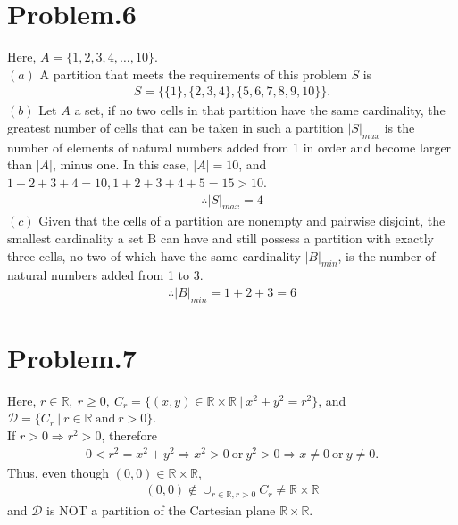 \documentclass[12pt]{article}
\begin{document}
\section*{Problem.6}
Here, $A = \{1,2,3,4,\dots,10\}$.\\[1em]
$(a)$ A partition that meets the requirements of this problem $S$ is
\begin{gather*}
S = \{\{1\}, \{2,3,4\}, \{5,6,7,8,9,10\}\}.
\end{gather*}
$(b)$ Let $A$ a set, if no two cells in that partition have the same cardinality, the greatest number of cells that can be taken in such a partition $|S|_{max}$ is the number of elements of natural numbers added from 1 in order and become larger than $|A|$, minus one.
In this case, $|A| = 10$, and $1+2+3+4 = 10, 1+2+3+4+5 = 15 > 10$.
\begin{gather*}
\therefore |S|_{max} = 4
\end{gather*}
$(c)$ 
Given that the cells of a partition are nonempty and pairwise disjoint,
the smallest cardinality a set B can have and still possess a partition with exactly three cells, no two of which have the same cardinality $|B|_{min}$, is the number of natural numbers added from 1 to 3.
\begin{gather*}
\therefore |B|_{min} = 1 + 2 + 3 = 6
\end{gather*}

\section*{Problem.7}
Here, $r \in \mathbb{R},~r \geq 0,~C_r = \{(x,y) \in \mathbb{R} \times \mathbb{R}~|~x^2 + y^2 = r^2\}$, and $\mathcal{D} = \{C_r~|~r \in \mathbb{R} ~\mathrm{and}~ r > 0\}$.\\
If $r > 0 \Rightarrow r^2 > 0$, therefore
\begin{gather*}
0 < r^2 = x^2 + y^2 \Rightarrow x^2 > 0~\mathrm{or}~y^2 > 0 \Rightarrow x \neq 0~\mathrm{or}~y \neq 0.
\end{gather*}
Thus, even though $(0,0) \in \mathbb{R} \times \mathbb{R}$,
\begin{gather*}
 (0,0) \notin \cup_{r \in \mathbb{R}, r > 0}  C_r \neq \mathbb{R} \times \mathbb{R}
\end{gather*}
and $\mathcal{D}$ is NOT a partition of the Cartesian plane $\mathbb{R} \times \mathbb{R}$.
\end{document}
